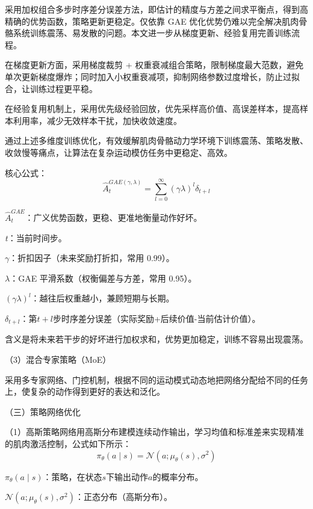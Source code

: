 采用加权组合多步时序差分误差方法，即估计的精度与方差之间求平衡点，得到高精确的优势函数，策略更新更稳定。仅依靠
GAE
优化优势仍难以完全解决肌肉骨骼系统训练震荡、易发散的问题。本文进一步从梯度更新、经验复用完善训练流程。

在梯度更新方面，采用梯度裁剪 +
权重衰减组合策略，限制梯度最大范数，避免单次更新梯度爆炸；同时加入小权重衰减项，抑制网络参数过度增长，防止过拟合，让训练过程更平稳。

在经验复用机制上，采用优先级经验回放，优先采样高价值、高误差样本，提高样本利用率，减少无效样本干扰，加快收敛速度。

通过上述多维度训练优化，有效缓解肌肉骨骼动力学环境下训练震荡、策略发散、收敛慢等痛点，让算法在复杂运动模仿任务中更稳定、高效。

核心公式：
\begin{equation}
\widehat{A}_{t}^{GAE(\gamma,\lambda)}=\sum_{l=0}^{\infty}(\gamma\lambda)^l\delta_{t+l}
\tag{3-2}
\end{equation}

\({\widehat{A}}_{t}^{GAE}\)：广义优势函数，更稳、更准地衡量动作好坏。

\emph{t}：当前时间步。

$\gamma$：折扣因子（未来奖励打折扣，常用 0.99）。

$\lambda$：GAE 平滑系数（权衡偏差与方差，常用 0.95）。

\((\gamma\lambda)^{l}\)：越往后权重越小，兼顾短期与长期。

\(\delta_{t + l}\)：第\(t + l\)步时序差分误差（实际奖励+后续价值-当前估计价值）。

含义是将未来若干步的好坏进行加权求和，优势更加稳定，训练不容易出现震荡。

（3）混合专家策略（MoE）

采用多专家网络、门控机制，根据不同的运动模式动态地把网络分配给不同的任务上，使复杂的动作得到更好的表达和泛化。

（三）策略网络优化

（1）高斯策略网络用高斯分布建模连续动作输出，学习均值和标准差来实现精准的肌肉激活控制，公式如下所示：
\begin{equation}
\pi_{\theta}(a\mid s)=\mathcal{N}\left(a;\mu_{\theta}(s),\sigma^2\right)
\tag{3-3}
\end{equation}

\(\pi_{\theta}(a \mid s)\)：策略，在状态\(s\)下输出动作\(a\)的概率分布。

\(\mathcal{N}\left( a;\mu_{\theta}(s),\sigma^{2} \right)\)：正态分布（高斯分布）。


